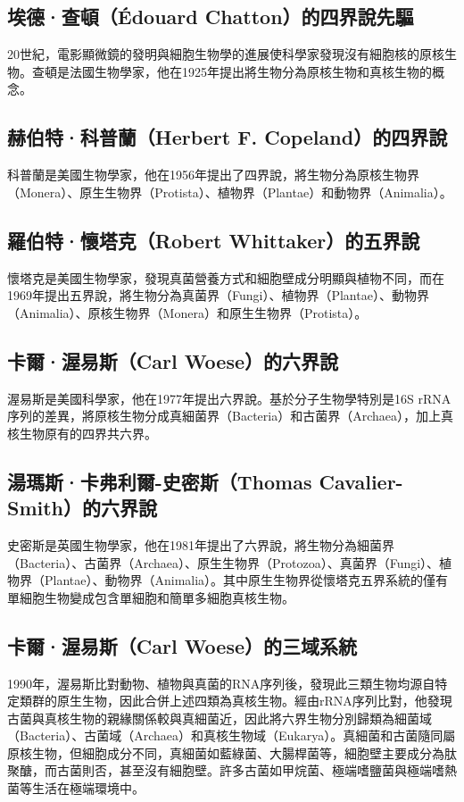 \documentclass[a4paper,12pt]{report}
\begin{document}
\subsection{埃德·查頓（Édouard Chatton）的四界說先驅}
20世紀，電影顯微鏡的發明與細胞生物學的進展使科學家發現沒有細胞核的原核生物。查頓是法國生物學家，他在1925年提出將生物分為原核生物和真核生物的概念。
\subsection{赫伯特·科普蘭（Herbert F. Copeland）的四界說}
科普蘭是美國生物學家，他在1956年提出了四界說，將生物分為原核生物界（Monera）、原生生物界（Protista）、植物界（Plantae）和動物界（Animalia）。
\subsection{羅伯特·懷塔克（Robert Whittaker）的五界說}
懷塔克是美國生物學家，發現真菌營養方式和細胞壁成分明顯與植物不同，而在1969年提出五界說，將生物分為真菌界（Fungi）、植物界（Plantae）、動物界（Animalia）、原核生物界（Monera）和原生生物界（Protista）。
\subsection{卡爾·渥易斯（Carl Woese）的六界說}
渥易斯是美國科學家，他在1977年提出六界說。基於分子生物學特別是16S rRNA序列的差異，將原核生物分成真細菌界（Bacteria）和古菌界（Archaea），加上真核生物原有的四界共六界。
\subsection{湯瑪斯·卡弗利爾-史密斯（Thomas Cavalier-Smith）的六界說}
史密斯是英國生物學家，他在1981年提出了六界說，將生物分為細菌界（Bacteria）、古菌界（Archaea）、原生生物界（Protozoa）、真菌界（Fungi）、植物界（Plantae）、動物界（Animalia）。其中原生生物界從懷塔克五界系統的僅有單細胞生物變成包含單細胞和簡單多細胞真核生物。
\subsection{卡爾·渥易斯（Carl Woese）的三域系統}
1990年，渥易斯比對動物、植物與真菌的RNA序列後，發現此三類生物均源自特定類群的原生生物，因此合併上述四類為真核生物。經由rRNA序列比對，他發現古菌與真核生物的親緣關係較與真細菌近，因此將六界生物分別歸類為細菌域（Bacteria）、古菌域（Archaea）和真核生物域（Eukarya）。真細菌和古菌隨同屬原核生物，但細胞成分不同，真細菌如藍綠菌、大腸桿菌等，細胞壁主要成分為肽聚醣，而古菌則否，甚至沒有細胞壁。許多古菌如甲烷菌、極端嗜鹽菌與極端嗜熱菌等生活在極端環境中。
\end{document}
